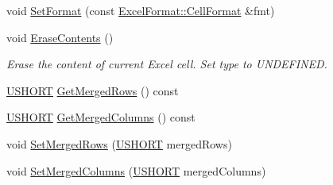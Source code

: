 \begin{DoxyCompactItemize}
\item 
void \hyperlink{class_y_excel_1_1_basic_excel_cell_a9dc8501a02d9ce25bfb9267d1683634f}{Set\+Format} (const \hyperlink{struct_excel_format_1_1_cell_format}{Excel\+Format\+::\+Cell\+Format} \&fmt)
\item 
void \hyperlink{class_y_excel_1_1_basic_excel_cell_aa37fb3b619162e28b49368a2a9bbbfd7}{Erase\+Contents} ()
\begin{DoxyCompactList}\small\item\em Erase the content of current Excel cell. Set type to U\+N\+D\+E\+F\+I\+N\+E\+D. \end{DoxyCompactList}\item 
\hyperlink{_basic_excel_8hpp_a5850d5316caf7f4cedd742fdf8cd7c02}{U\+S\+H\+O\+R\+T} \hyperlink{class_y_excel_1_1_basic_excel_cell_a51fbd578f7201dc5eb00cb3cac0c803e}{Get\+Merged\+Rows} () const 
\item 
\hyperlink{_basic_excel_8hpp_a5850d5316caf7f4cedd742fdf8cd7c02}{U\+S\+H\+O\+R\+T} \hyperlink{class_y_excel_1_1_basic_excel_cell_a478284e685e6540df048ab2c3b8b9b0e}{Get\+Merged\+Columns} () const 
\item 
void \hyperlink{class_y_excel_1_1_basic_excel_cell_ab0ec2595f0a47d7472dfb1b0f4887749}{Set\+Merged\+Rows} (\hyperlink{_basic_excel_8hpp_a5850d5316caf7f4cedd742fdf8cd7c02}{U\+S\+H\+O\+R\+T} merged\+Rows)
\item 
void \hyperlink{class_y_excel_1_1_basic_excel_cell_afff92187b5a0f7f12c90b4aefb5e7bb3}{Set\+Merged\+Columns} (\hyperlink{_basic_excel_8hpp_a5850d5316caf7f4cedd742fdf8cd7c02}{U\+S\+H\+O\+R\+T} merged\+Columns)
\end{DoxyCompactItemize}
